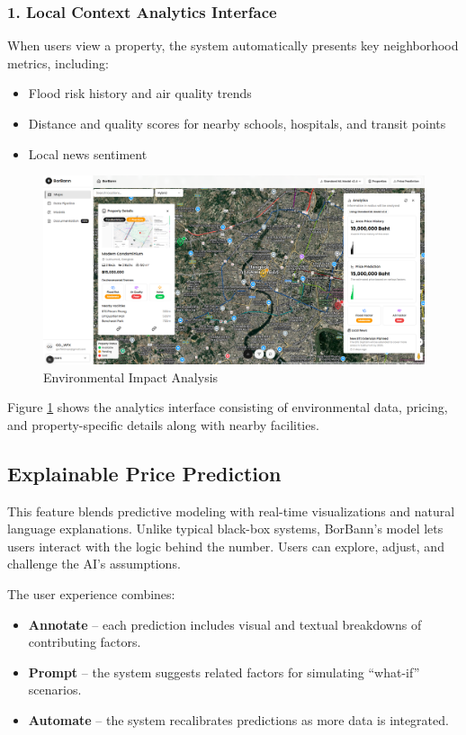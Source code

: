 \subsubsection*{1. Local Context Analytics Interface}

When users view a property, the system automatically presents key neighborhood metrics, including:

\begin{itemize}
	\item Flood risk history and air quality trends
	\item Distance and quality scores for nearby schools, hospitals, and transit points
	\item Local news sentiment
\end{itemize}

\begin{figure}[htbp]
	\centering
	\includegraphics[width=1\textwidth]{assets/ai/insight-1.png}
	\caption{Environmental Impact Analysis}
	\label{fig:insight-ui-1}
\end{figure}

Figure \ref{fig:insight-ui-1} shows the analytics interface consisting of environmental data, pricing, and property-specific details along with nearby facilities.

\subsection{Explainable Price Prediction}

This feature blends predictive modeling with real-time visualizations and natural language explanations. Unlike typical black-box systems, BorBann’s model lets users interact with the logic behind the number. Users can explore, adjust, and challenge the AI's assumptions.

The user experience combines:

\begin{itemize}
	\item \textbf{Annotate} – each prediction includes visual and textual breakdowns of contributing factors.
	\item \textbf{Prompt} – the system suggests related factors for simulating “what-if” scenarios.
	\item \textbf{Automate} – the system recalibrates predictions as more data is integrated.
\end{itemize}

